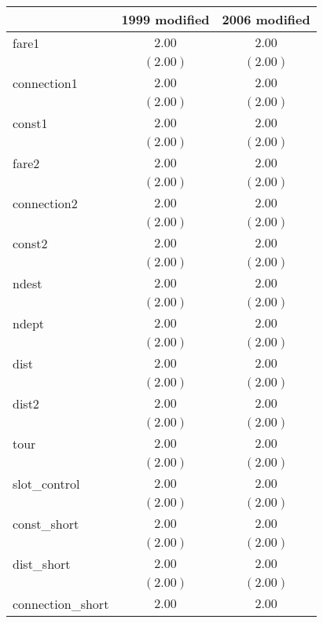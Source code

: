 
\begin{table}
\begin{center}
\begin{tabular}{l c c}
\hline
 & 1999 modified & 2006 modified \\
\hline
fare1             & $2.00$   & $2.00$   \\
                  & $(2.00)$ & $(2.00)$ \\
connection1       & $2.00$   & $2.00$   \\
                  & $(2.00)$ & $(2.00)$ \\
const1            & $2.00$   & $2.00$   \\
                  & $(2.00)$ & $(2.00)$ \\
fare2             & $2.00$   & $2.00$   \\
                  & $(2.00)$ & $(2.00)$ \\
connection2       & $2.00$   & $2.00$   \\
                  & $(2.00)$ & $(2.00)$ \\
const2            & $2.00$   & $2.00$   \\
                  & $(2.00)$ & $(2.00)$ \\
ndest             & $2.00$   & $2.00$   \\
                  & $(2.00)$ & $(2.00)$ \\
ndept             & $2.00$   & $2.00$   \\
                  & $(2.00)$ & $(2.00)$ \\
dist              & $2.00$   & $2.00$   \\
                  & $(2.00)$ & $(2.00)$ \\
dist2             & $2.00$   & $2.00$   \\
                  & $(2.00)$ & $(2.00)$ \\
tour              & $2.00$   & $2.00$   \\
                  & $(2.00)$ & $(2.00)$ \\
slot\_control     & $2.00$   & $2.00$   \\
                  & $(2.00)$ & $(2.00)$ \\
const\_short      & $2.00$   & $2.00$   \\
                  & $(2.00)$ & $(2.00)$ \\
dist\_short       & $2.00$   & $2.00$   \\
                  & $(2.00)$ & $(2.00)$ \\
connection\_short & $2.00$   & $2.00$   \\

\end{tabular}
\end{center}
\end{table}
